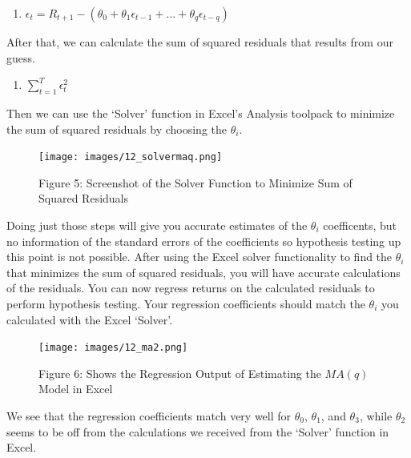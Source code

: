 \documentclass[
  letterpaper,
  DIV=11,
  numbers=noendperiod]{scrreprt}
\providecommand{\tightlist}{%
  \setlength{\itemsep}{0pt}\setlength{\parskip}{0pt}}\usepackage{longtable,booktabs,array}
\begin{document}
\begin{enumerate}
\def\labelenumi{\arabic{enumi}.}
\setcounter{enumi}{2}
\tightlist
\item
  \(\epsilon_{t} = R_{t+1} - (\theta_0 + \theta_1\epsilon_{t-1} + ... + \theta_q\epsilon_{t-q})\)
\end{enumerate}

After that, we can calculate the sum of squared residuals that results
from our guess.

\begin{enumerate}
\def\labelenumi{\arabic{enumi}.}
\setcounter{enumi}{3}
\tightlist
\item
  \(\sum_{t=1}^{T} \epsilon_t^2\)
\end{enumerate}

Then we can use the `Solver' function in Excel's Analysis toolpack to
minimize the sum of squared residuals by choosing the \(\theta_i\).

\begin{figure}

{\centering \texttt{[image: images/12\_solvermaq.png]}

}

\caption{Figure 5: Screenshot of the Solver Function to Minimize Sum of
Squared Residuals}

\end{figure}

Doing just those steps will give you accurate estimates of the
\(\theta_i\) coefficents, but no information of the standard errors of
the coefficients so hypothesis testing up this point is not possible.
After using the Excel solver functionality to find the \(\theta_i\) that
minimizes the sum of squared residuals, you will have accurate
calculations of the residuals. You can now regress returns on the
calculated residuals to perform hypothesis testing. Your regression
coefficients should match the \(\theta_i\) you calculated with the Excel
`Solver'.

\begin{figure}

{\centering \texttt{[image: images/12\_ma2.png]}

}

\caption{Figure 6: Shows the Regression Output of Estimating the
\(MA(q)\) Model in Excel}

\end{figure}

We see that the regression coefficients match very well for
\(\theta_0\), \(\theta_1\), and \(\theta_3\), while \(\theta_2\) seems
to be off from the calculations we received from the `Solver' function
in Excel.
\end{document}
